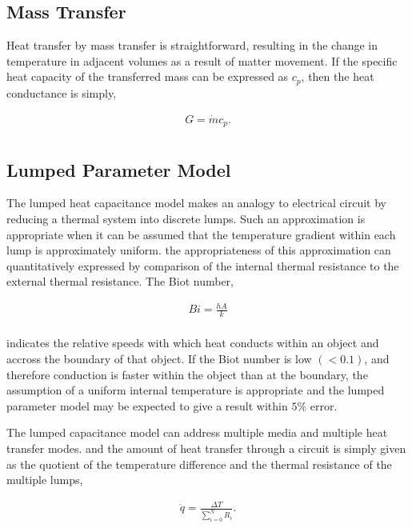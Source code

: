 \subsection{Mass Transfer}

Heat transfer by mass transfer is straightforward, resulting in the change in 
temperature in adjacent volumes as a result of matter movement. If the specific 
heat capacity of the transferred mass can be expressed as $c_p$, then the heat 
conductance is simply, 

\begin{align*}
  G = \dot{m}c_p.\\
\end{align*}

\subsection{Lumped Parameter Model}

The lumped heat capacitance model makes an analogy to electrical circuit by 
reducing a thermal system into discrete lumps. Such an approximation is 
appropriate when it can be assumed that the temperature gradient within each 
lump is approximately uniform. the appropriateness of this approximation can 
quantitatively expressed by comparison of the internal thermal resistance to the 
external thermal resistance. The Biot number, 

\begin{align}
  Bi = \frac{hA}{k}\\
  \label{biot}
\end{align}

indicates the relative speeds with which heat conducts within an object and 
accross the boundary of that object. If the Biot number is low $(<0.1)$, and 
therefore conduction is faster within the object than at the boundary, the 
assumption of a uniform internal temperature is appropriate and the lumped 
parameter model may be expected to give a result within $5\%$ 
error.\cite{incropera_fundamentals_2006} 

The lumped capacitance model can address multiple media and multiple heat
transfer modes. and the amount of heat transfer through a circuit is simply 
given as the quotient of the temperature difference and the thermal resistance
of the multiple lumps,

\begin{align*}
  \dot{q} = \frac{\Delta T}{\sum _{i=0}^{N}R_i}.
\end{align*}

